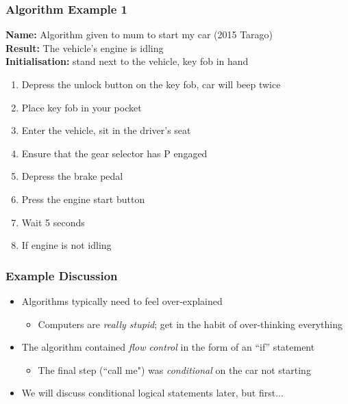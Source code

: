 \documentclass[14pt]{beamer}
\begin{document}
\begin{frame}[fragile] %

\frametitle{Algorithm Example 1}
{\footnotesize
\textbf{Name:} Algorithm given to mum to start my car (2015 Tarago) \\
\textbf{Result:} The vehicle's engine is idling \\
\textbf{Initialisation:} stand next to the vehicle, key fob in hand 
\begin{enumerate}
\setlength{\itemsep}{1pt}
  \setlength{\parskip}{0pt}
  \setlength{\parsep}{0pt}
\item Depress the unlock button on the key fob, car will beep twice
\item Place key fob in your pocket
\item Enter the vehicle, sit in the driver's seat
\item Ensure that the gear selector has P engaged
\item Depress the brake pedal
\item Press the engine start button
\item Wait 5 seconds
\item If engine is not idling
	\begin{itemize}
		\footnotesize{
		\item Call me}
	\end{itemize}
\end{enumerate}
}
\end{frame}

\begin{frame} %
\frametitle{Example Discussion}
\begin{itemize}
\item Algorithms typically need to feel over-explained
	\begin{itemize}
		\item Computers are \textit{really stupid}; get in the habit of over-thinking everything
	\end{itemize}
\item The algorithm contained \textit{flow control} in the form of an ``if'' statement
	\begin{itemize}
		\item The final step (``call me") was \textit{conditional} on the car not starting
	\end{itemize}
\item We will discuss conditional logical statements later, but first...
\end{itemize}
\end{frame}
\end{document}
